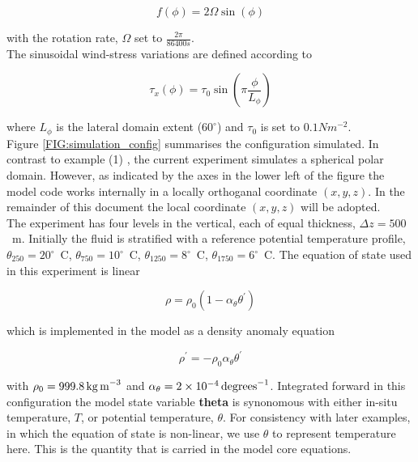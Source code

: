 \begin{equation}
\label{EQ:fcori}
f(\phi) = 2 \Omega \sin( \phi )
\end{equation}
 
\noindent with the rotation rate, $\Omega$ set to $\frac{2 \pi}{86400s}$.
\\
  
 The sinusoidal wind-stress variations are defined according to 

\begin{equation}
\label{EQ:taux}
\tau_x(\phi) = \tau_{0}\sin(\pi \frac{\phi}{L_{\phi}})
\end{equation}
 
\noindent where $L_{\phi}$ is the lateral domain extent ($60^{\circ}$) and 
$\tau_0$ is set to $0.1N m^{-2}$. 
\\

Figure \ref{FIG:simulation_config}
summarises the configuration simulated.
In contrast to example (1) \cite{baro_gyre_case_study}, the current 
experiment simulates a spherical polar domain. However, as indicated
by the axes in the lower left of the figure the model code works internally
in a locally orthoganal coordinate $(x,y,z)$. In the remainder of this
document the local coordinate $(x,y,z)$ will be adopted.
\\

The experiment has four levels in the vertical, each of equal thickness,
$\Delta z = 500$~m. Initially the fluid is stratified with a reference
potential temperature profile,
$\theta_{250}=20^{\circ}$~C,
$\theta_{750}=10^{\circ}$~C,
$\theta_{1250}=8^{\circ}$~C,
$\theta_{1750}=6^{\circ}$~C. The equation of state used in this experiment is 
linear

\begin{equation}
\label{EQ:linear1_eos}
\rho = \rho_{0} ( 1 - \alpha_{\theta}\theta^{'} )
\end{equation}

\noindent which is implemented in the model as a density anomaly equation

\begin{equation}
\label{EQ:linear1_eos_pert}
\rho^{'} = -\rho_{0}\alpha_{\theta}\theta^{'}
\end{equation}

\noindent with $\rho_{0}=999.8\,{\rm kg\,m}^{-3}$ and 
$\alpha_{\theta}=2\times10^{-4}\,{\rm degrees}^{-1} $. Integrated forward in
this configuration the model state variable {\bf theta} is synonomous with
either in-situ temperature, $T$, or potential temperature, $\theta$. For 
consistency with later examples, in which the equation of state is
non-linear, we use $\theta$ to represent temperature here. This is
the quantity that is carried in the model core equations.

